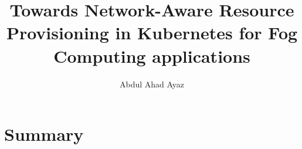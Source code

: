 \documentclass[12pt,twoside,doublepage]{article}
\newcommand{\teilnehmer}{Abdul Ahad Ayaz}
\newcommand{\ausarbeitung}{Towards Network-Aware Resource Provisioning in Kubernetes
for Fog Computing applications}
\begin{document}
\title{\ausarbeitung}
\author{\teilnehmer}
\date{}
\maketitle
\thispagestyle{empty}





\section{Summary}
\label{sec:summary}
\end{document}
